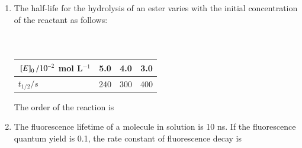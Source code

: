 \documentclass[journal,12pt,onecolumn]{IEEEtran}
\theoremstyle{remark}
\begin{document}
\begin{enumerate}[resume]
\begin{enumerate}
        \hfill{}
    \end{enumerate}



\item The half-life  for the hydrolysis of an ester varies with the initial concentration of the reactant  as follows:
    \begin{center}
    \begin{table}[H]\
    \large
    \centering
    \begin{tabular}{|l|c|c|c|}
    \hline
    ${}\left[E\right]_0 / 10^{-2}$ mol L$^{-1}$ & 5.0 & 4.0 & 3.0 \\
    \hline
    $t_{1/2} / s$ & 240 & 300 & 400 \\
    \hline
    \end{tabular}
    \caption*{}
    \label{tab:q41}
   \end{table}
  \end{center}
    The order of the reaction is
    \begin{enumerate}
        \hfill{}
    \end{enumerate}



\item The fluorescence lifetime of a molecule in solution is 10 ns.
 If the fluorescence quantum yield is 0.1, the rate constant of fluorescence decay is
    \begin{enumerate}
        \hfill{}
    \end{enumerate}




\end{enumerate}
\end{document}
